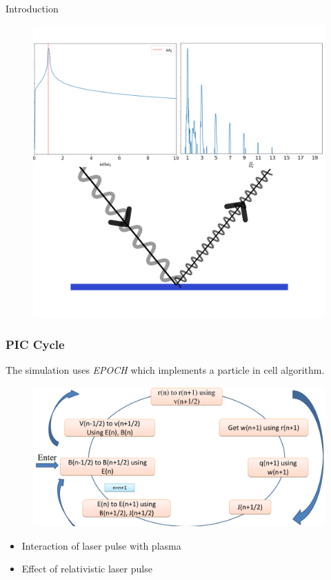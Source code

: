 \documentclass{beamer}
\begin{document}
\begin{frame}{Introduction}
\begin{minipage}[t]{0.49\linewidth}
\begin{figure}
            \includegraphics[width=1.0\textwidth, height=0.42\textheight]{images/harmonics.png}
            \label{fig:harmonics}
        \end{figure}
    \end{minipage}

\end{frame}
\begin{frame}
    \frametitle{PIC Cycle}
    \small
    The simulation uses \textit{EPOCH} which implements a particle in cell algorithm.
    \begin{figure}
        \centering
        \includegraphics[width=1.0\textwidth, height=0.50\textheight]{images/PIC.png}
        \label{fig:pic}
    \end{figure}
    \begin{itemize}
        \item Interaction of laser pulse with plasma
        \item Effect of relativistic laser pulse
    \end{itemize}
\end{frame}
\end{document}
